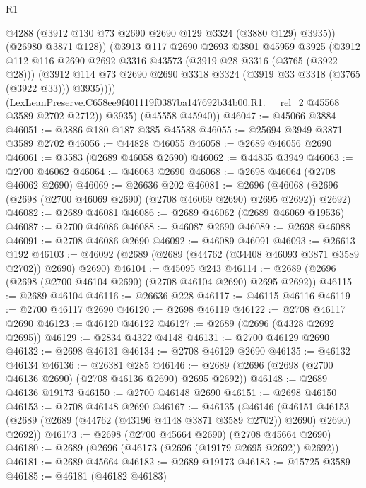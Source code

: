 \begin{lexlean}{R1}
\begin{coremodule}
                @4288
                (@3912 @130 @73 @2690 @2690 @129 @3324 (@3880 @129) @3935))
              (@26980 @3871 @128))
            (@3913
              @117
              @2690
              @2693
              @3801
              @45959
              @3925
              (@3912
                @112
                @116
                @2690
                @2692
                @3316
                @43573
                (@3919 @28 @3316 (@3765 (@3922 @28)))
                (@3912
                  @114
                  @73
                  @2690
                  @2690
                  @3318
                  @3324
                  (@3919 @33 @3318 (@3765 (@3922 @33)))
                  @3935))))
          (LexLeanPreserve.C658ee9f401119f0387ba147692b34b00.R1.__rel_2 @45568 @3589 @2702 @2712))
        @3935)
      (@45558 @45940))
@46047 := @45066 @3884
@46051 := @3886 @180 @187 @385 @45588
@46055 := @25694 @3949 @3871 @3589 @2702
@46056 := @44828 @46055
@46058 := @2689 @46056 @2690
@46061 := @3583 (@2689 @46058 @2690)
@46062 := @44835 @3949
@46063 := @2700 @46062
@46064 := @46063 @2690
@46068 := @2698 @46064 (@2708 @46062 @2690)
@46069 := @26636 @202
@46081 := @2696 (@46068 (@2696 (@2698 (@2700 @46069 @2690) (@2708 @46069 @2690) @2695 @2692)) @2692)
@46082 := @2689 @46081
@46086 := @2689 @46062 (@2689 @46069 @19536)
@46087 := @2700 @46086
@46088 := @46087 @2690
@46089 := @2698 @46088
@46091 := @2708 @46086 @2690
@46092 := @46089 @46091
@46093 := @26613 @192
@46103 := @46092 (@2689 (@2689 (@44762 (@34408 @46093 @3871 @3589 @2702)) @2690) @2690)
@46104 := @45095 @243
@46114 := @2689 (@2696 (@2698 (@2700 @46104 @2690) (@2708 @46104 @2690) @2695 @2692))
@46115 := @2689 @46104
@46116 := @26636 @228
@46117 := @46115 @46116
@46119 := @2700 @46117 @2690
@46120 := @2698 @46119
@46122 := @2708 @46117 @2690
@46123 := @46120 @46122
@46127 := @2689 (@2696 (@4328 @2692 @2695))
@46129 := @2834 @4322 @4148
@46131 := @2700 @46129 @2690
@46132 := @2698 @46131
@46134 := @2708 @46129 @2690
@46135 := @46132 @46134
@46136 := @26381 @285
@46146 := @2689 (@2696 (@2698 (@2700 @46136 @2690) (@2708 @46136 @2690) @2695 @2692))
@46148 := @2689 @46136 @19173
@46150 := @2700 @46148 @2690
@46151 := @2698 @46150
@46153 := @2708 @46148 @2690
@46167 := @46135
    (@46146
      (@46151 @46153 (@2689 (@2689 (@44762 (@43196 @4148 @3871 @3589 @2702)) @2690) @2690) @2692))
@46173 := @2698 (@2700 @45664 @2690) (@2708 @45664 @2690)
@46180 := @2689 (@2696 (@46173 (@2696 (@19179 @2695 @2692)) @2692))
@46181 := @2689 @45664
@46182 := @2689 @19173
@46183 := @15725 @3589
@46185 := @46181 (@46182 @46183)

\end{coremodule}
\end{lexlean}
